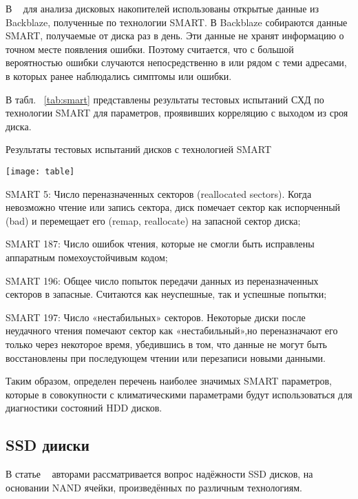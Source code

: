 В ~\cite{diskred} для анализа дисковых накопителей использованы открытые данные из Backblaze,  полученные  по  технологии SMART.  В Backblaze собираются  данные SMART,  получаемые  от диска  раз  в день.  Эти данные не хранят информацию о точном месте появления ошибки. Поэтому считается, что с большой вероятностью ошибки случаются непосредственно в или рядом с теми адресами, в которых ранее наблюдались симптомы или ошибки.

В табл. ~\ref{tab:smart} представлены результаты тестовых испытаний СХД по технологии SMART для параметров, проявивших корреляцию с выходом из сроя диска.
\begin{table}
	\captionsetup{skip=5pt}
	\caption{Результаты тестовых испытаний дисков с технологией SMART}
	\centering
	\texttt{[image: table]}
	\label{tab:smart}
\end{table}
\begin{itemize*}
	\item{SMART 5:  Число  переназначенных  секторов  (reallocated sectors).  Когда невозможно чтение или запись сектора, диск помечает сектор как испорченный (bad) и перемещает его (remap, reallocate) на запасной сектор диска;}
	\item{SMART 187:  Число  ошибок  чтения,  которые  не  смогли  быть  исправлены аппаратным помехоустойчивым кодом;}
	\item{SMART 196:  Общее  число  попыток  передачи  данных  из  переназначенных секторов в запасные. Считаются как неуспешные, так и успешные попытки;}
	\item{SMART 197:  Число «нестабильных» секторов.  Некоторые  диски  после неудачного  чтения  помечают  сектор  как «нестабильный»,но  переназначают  его только  через  некоторое  время,  убедившись  в  том,  что  данные  не  могут  быть восстановлены при последующем чтении или перезаписи новыми данными.} 
\end{itemize*}

Таким образом, определен перечень наиболее значимых SMART параметров, которые в совокупности с климатическими параметрами будут использоваться для  диагностики состояний HDD дисков. 
\subsection{SSD дииски}

В статье ~\cite{reliabil} авторами рассматривается вопрос надёжности SSD дисков, на основании NAND ячейки, произведённых по различным технологиям.

